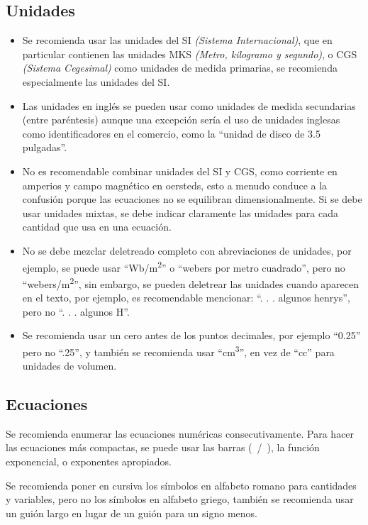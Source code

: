 \documentclass[letterpaper, 10pt, conference]{IEEEtran} %
\begin{document}
	\subsection{Unidades} \label{subseccionUnidades}
	\begin{itemize}
		\item Se recomienda usar las unidades del SI \emph{(Sistema Internacional)}, que en particular contienen las unidades MKS \emph{(Metro, kilogramo y segundo)}, o CGS \emph{(Sistema Cegesimal)} como unidades de medida primarias, se recomienda especialmente las unidades del SI.
		\item Las unidades en inglés se pueden usar como unidades de medida secundarias (entre paréntesis) aunque una excepción sería el uso de unidades inglesas como identificadores en el comercio, como la ``unidad de disco de 3.5 pulgadas''.
		\item No es recomendable combinar unidades del SI y CGS, como corriente en amperios y campo magnético en oersteds, esto a menudo conduce a la confusión porque las ecuaciones no se equilibran dimensionalmente. Si se debe usar unidades mixtas, se debe indicar claramente las unidades para cada cantidad que usa en una ecuación.
		\item No se debe mezclar deletreado completo con abreviaciones de unidades, por ejemplo, se puede usar ``Wb/m\textsuperscript{2}'' o ``webers por metro cuadrado'', pero no ``webers/m\textsuperscript{2}'', sin embargo, se pueden deletrear las unidades cuando aparecen en el texto, por ejemplo, es recomendable mencionar: ``. . . algunos henrys'', pero no ``. . . algunos H''.
		\item Se recomienda usar un cero antes de los puntos decimales, por ejemplo ``0.25'' pero no ``.25'', y también se recomienda usar ``cm\textsuperscript{3}'', en vez de ``cc'' para unidades de volumen.
	\end{itemize}
	
	\subsection{Ecuaciones} \label{subseccionEcuaciones}
	Se recomienda enumerar las ecuaciones numéricas consecutivamente. Para hacer las ecuaciones más compactas, se puede usar las barras (~/~), la función exponencial, o exponentes apropiados.
	
	Se recomienda poner en cursiva los símbolos en alfabeto romano para cantidades y variables, pero no los símbolos en alfabeto griego, también se recomienda usar un guión largo en lugar de un guión para un signo menos. 
	
\end{document}
